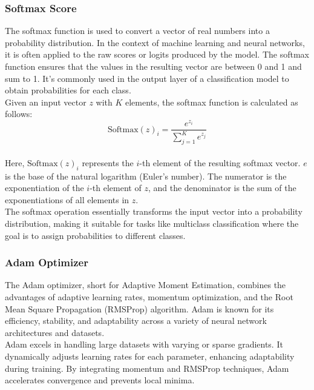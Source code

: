 \subsubsection{Softmax Score}
The softmax function is used to convert a vector of real numbers into a probability distribution. In the context of machine learning and neural networks, it is often applied to the raw scores or logits produced by the model. The softmax function ensures that the values in the resulting vector are between 0 and 1 and sum to 1. It's commonly used in the output layer of a classification model to obtain probabilities for each class.\\

Given an input vector \(z\) with \(K\) elements, the softmax function is calculated as follows:\\

\[ \text{Softmax}(z)_i = \frac{e^{z_i}}{\sum_{j=1}^{K} e^{z_j}} \]\\

Here, \(\text{Softmax}(z)_i\) represents the \(i\)-th element of the resulting softmax vector. \(e\) is the base of the natural logarithm (Euler's number). The numerator is the exponentiation of the \(i\)-th element of \(z\), and the denominator is the sum of the exponentiations of all elements in \(z\).\\

The softmax operation essentially transforms the input vector into a probability distribution, making it suitable for tasks like multiclass classification where the goal is to assign probabilities to different classes.\\

\subsubsection{Adam Optimizer}

The Adam optimizer, short for Adaptive Moment Estimation, combines the advantages of adaptive learning rates, momentum optimization, and the Root Mean Square Propagation (RMSProp) algorithm. Adam is known for its efficiency, stability, and adaptability across a variety of neural network architectures and datasets.\\

Adam excels in handling large datasets with varying or sparse gradients. It dynamically adjusts learning rates for each parameter, enhancing adaptability during training. By integrating momentum and RMSProp techniques, Adam accelerates convergence and prevents local minima.\\

